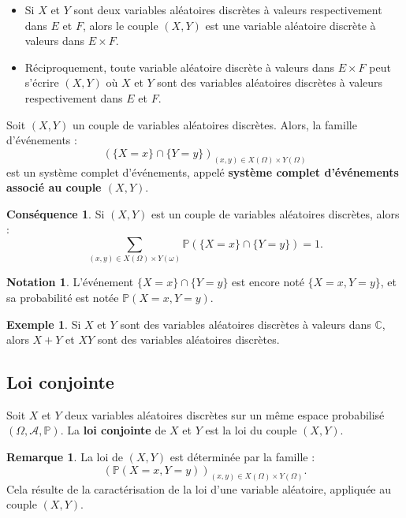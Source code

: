 \documentclass[french]{article}
\renewcommand{\P}{\mathbb{P}}
\newcommand{\C}{\mathbb{C}}
\theoremstyle{plain}
\theoremstyle{definition}
\newtheorem*{ex}{Exemple}
\newtheorem*{rmq}{Remarque}
\newtheorem*{notation}{Notation}
\newtheorem*{conséquence}{Conséquence}
\theoremstyle{remark}
\begin{document}
\begin{prop}%
	\begin{itemize}
		\item Si $X$ et $Y$ sont deux variables aléatoires discrètes à valeurs respectivement dans $E$ et $F$, alors le couple $(X,Y)$ est une variable aléatoire discrète à valeurs dans $E\times F$.
		\item Réciproquement, toute variable aléatoire discrète à valeurs dans $E\times F$ peut s'écrire $(X,Y)$ où $X$ et $Y$ sont des variables aléatoires discrètes à valeurs respectivement dans $E$ et $F$.
	\end{itemize}
\end{prop}

\begin{cor}%
	Soit $(X,Y)$ un couple de variables aléatoires discrètes. Alors, la famille d'événements :
	$$(\{X=x\}\cap\{Y=y\})_{(x,y)\in X(\Omega)\times Y(\Omega)}$$ est un système complet d'événements, appelé \textbf{système complet d'événements associé au couple $(X,Y)$}.
\end{cor}

\begin{conséquence}
	Si $(X,Y)$ est un couple de variables aléatoires discrètes, alors :
	$$\sum_{(x,y)\in X(\Omega)\times Y(\omega)}\P(\{X=x\}\cap\{Y=y\})=1.$$
\end{conséquence}

\begin{notation}
	L'événement $\{X=x\}\cap\{Y=y\}$ est encore noté $\{X=x,Y=y\}$, et sa probabilité est notée $\P(X=x,Y=y)$.
\end{notation}

\begin{ex}
	Si $X$ et $Y$ sont des variables aléatoires discrètes à valeurs dans $\C$, alors $X+Y$ et $XY$ sont des variables aléatoires discrètes. %
\end{ex}

\subsection{Loi conjointe}

\begin{dfn}
	Soit $X$ et $Y$ deux variables aléatoires discrètes sur un même espace probabilisé $(\Omega,\mathcal{A},\P)$. La \textbf{loi conjointe} de $X$ et $Y$ est la loi du couple $(X,Y)$.
\end{dfn}

\begin{rmq}
	La loi de $(X,Y)$ est déterminée par la famille :
	$$(\P(X=x,Y=y))_{(x,y)\in X(\Omega)\times Y(\Omega)}.$$
	Cela résulte de la caractérisation de la loi d'une variable aléatoire, appliquée au couple $(X,Y)$.
\end{rmq}
\end{document}
